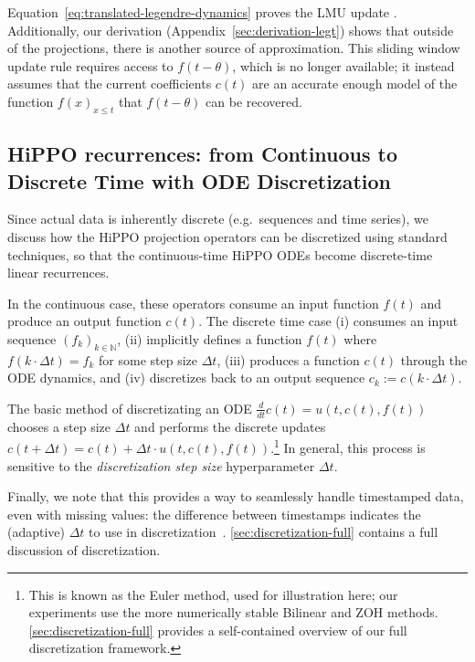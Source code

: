 \documentclass{article}
\newcommand{\N}{\mathbb{N}}
\begin{document}
Equation~\eqref{eq:translated-legendre-dynamics} proves the LMU update \citep[equation (1)]{voelker2019legendre}.
Additionally, our derivation (Appendix~\ref{sec:derivation-legt}) shows that outside of the projections,
there is another source of approximation.
This sliding window update rule requires access to $f(t-\theta)$, which is no longer available;
it instead assumes that the current coefficients $c(t)$ are an accurate enough model of the function $f(x)_{x \le t}$ that $f(t-\theta)$ can be recovered.





\subsection{HiPPO recurrences: from Continuous to Discrete Time with ODE Discretization}
\label{sec:discretization}

Since actual data is inherently discrete (e.g.\ sequences and time series),
we discuss how the HiPPO projection operators can be discretized using standard techniques,
so that the continuous-time HiPPO ODEs become discrete-time linear recurrences.





In the continuous case, these operators consume an input function $f(t)$ and produce an output function $c(t)$.
The discrete time case (i) consumes an input sequence $(f_k)_{k \in \N}$, (ii) implicitly defines a function $f(t)$ where $f(k \cdot \Delta t) = f_k$ for some step
size $\Delta t$, (iii) produces a function $c(t)$ through the ODE dynamics,
and (iv) discretizes back to an output sequence $c_k := c(k \cdot \Delta t)$.


The basic method of discretizating an ODE $\frac{d}{dt} c(t) = u(t, c(t), f(t))$ chooses a step size $\Delta t$ and performs the discrete updates
$c(t+\Delta t) = c(t) + \Delta t \cdot u(t, c(t), f(t))$.\footnote{This is known as the Euler method, used for illustration here; our experiments use the more numerically stable Bilinear and ZOH methods.
\cref{sec:discretization-full} provides a self-contained overview of our full discretization framework.}
In general, this process is sensitive to the \emph{discretization step size} hyperparameter $\Delta t$.

Finally, we note that this provides a way to seamlessly handle timestamped data, even with missing values:
the difference between timestamps indicates the (adaptive) $\Delta t$ to use in discretization~\citep{chen2018neural}.
\cref{sec:discretization-full} contains a full discussion of discretization.
\end{document}
